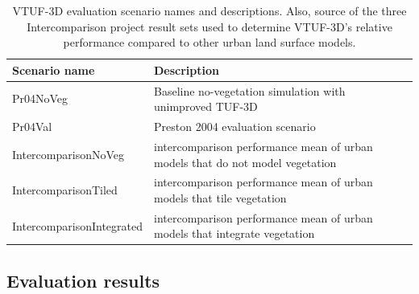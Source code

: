 \documentclass[final,3p,times,authoryear]{elsarticle}
\begin{document}
\begin{center}
\begin{table}[!htbp]
\caption{VTUF-3D evaluation scenario names and descriptions. Also, source of the three Intercomparison project result sets used to determine VTUF-3D's relative performance compared to other urban land surface models.\label{tab:simscompared}} 
\begin{tabular}{  | p{0.30\linewidth} | p{0.70\linewidth} |  } 
\hline \textbf{Scenario name} & \textbf{Description}  \\ \hline
Pr04NoVeg & Baseline no-vegetation simulation with unimproved TUF-3D    \\ \hline
Pr04Val & Preston 2004 evaluation scenario  \\ \hline	
IntercomparisonNoVeg & \cite{Best2012} intercomparison performance mean of urban models that do not model vegetation  \\ \hline
IntercomparisonTiled & \cite{Best2012} intercomparison performance mean of urban models that tile vegetation  \\ \hline
IntercomparisonIntegrated & \cite{Best2012} intercomparison performance mean of urban models that integrate vegetation \\ \hline
  \end{tabular} 
\end{table}
\end{center}


\subsection{Evaluation results}\label{sec:evalresults}
\end{document}

